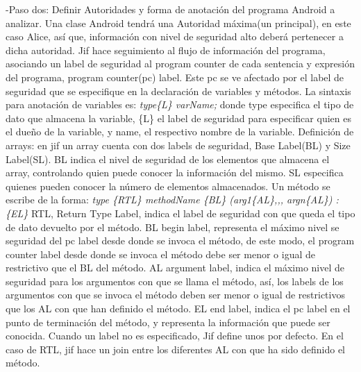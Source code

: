 -Paso dos: 
Definir Autoridades y forma de anotación del programa Android a analizar.
Una clase Android tendrá una Autoridad máxima(un principal), en este caso Alice,
así que, información con nivel de seguridad alto deberá pertenecer a dicha
autoridad.\newline
Jif hace seguimiento al flujo de información del programa, asociando un label
de seguridad al program counter de cada sentencia y expresión del programa,
program counter(pc) label. Este pc se ve afectado por el label
de seguridad que se especifique en la declaración de variables y
métodos.\newline 
La sintaxis para anotación de variables es: \newline 
\emph{ type\{L\} varName; } \newline donde type especifica el tipo de dato que
almacena la variable, \{L\} el label de seguridad  para especificar quien es el
dueño de la variable, y name, el respectivo nombre de la variable.\newline
Definición de arrays:\newline
en jif un array cuenta con dos labels de seguridad, Base Label(BL) y Size
Label(SL). BL indica el nivel de seguridad de los elementos que almacena el
array, controlando quien puede conocer la información del mismo. SL especifica
quienes pueden conocer la número de elementos almacenados.\newline
Un método se escribe de la forma:\newline
\emph{ type \{RTL\} methodName \{BL\} (arg1\{AL\},,, argn\{AL\}) :\{EL\}
}\newline RTL, Return Type Label, indica el label de seguridad con que
queda el tipo de dato devuelto por el método.\newline 
BL begin label, representa el máximo nivel se seguridad del pc label desde donde
se invoca el método, de este modo, el program counter label desde donde
se invoca el método debe ser menor o igual de restrictivo que el BL del
método.\newline 
AL argument label, indica el máximo nivel de seguridad  para los argumentos con
que se llama el método, así, los labels de los argumentos con que se invoca el
método deben ser menor o igual de restrictivos que los AL con que han
definido el método.\newline
EL end label, indica el pc label en el punto de terminación del método, y
representa la información que puede ser conocida.\newline
Cuando un label no es especificado, Jif define unos por defecto. En el caso de
RTL, jif hace un join entre los diferentes AL con que ha sido definido el
método.\newline

